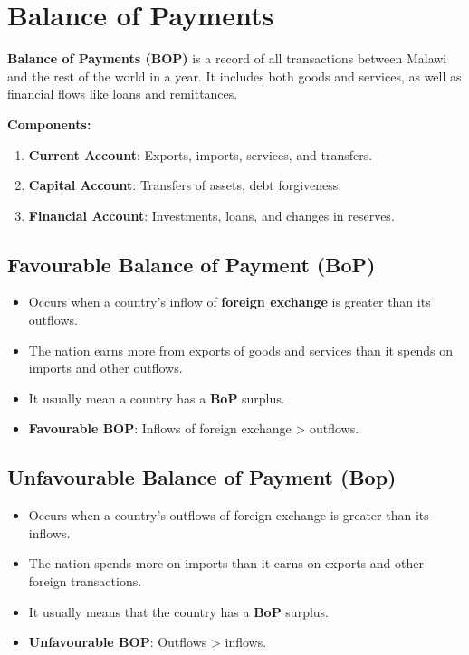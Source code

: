 \documentclass[14pt,a4paper, openany]{book}
\begin{document}
\section{Balance of Payments}
\textbf{Balance of Payments (BOP)} is a record of all transactions between Malawi and the rest of the world in a year.
It includes both goods and services, as well as financial flows like loans and remittances.

\textbf{Components:}
\begin{enumerate}
	\item \textbf{Current Account}: Exports, imports, services, and transfers.
	\item \textbf{Capital Account}: Transfers of assets, debt forgiveness.
	\item \textbf{Financial Account}: Investments, loans, and changes in reserves.
\end{enumerate}

\subsection{Favourable Balance of Payment (BoP)}
\begin{itemize}
	\item Occurs when a country's inflow of \textbf{foreign exchange} is greater than its outflows.
	\item The nation earns more from exports of goods and services than it spends on imports and other outflows.
	\item It usually mean a country has a \textbf{BoP} surplus.
	\item \textbf{Favourable BOP}: Inflows of foreign exchange > outflows.
\end{itemize}

\subsection{Unfavourable Balance of Payment (Bop)}
\begin{itemize}
	\item Occurs when a country's outflows of foreign exchange is greater than its inflows.
	\item The nation spends more on imports than it earns on exports and other foreign transactions.
	\item It usually means that the country has a \textbf{BoP} surplus.
	\item \textbf{Unfavourable BOP}: Outflows > inflows.
\end{itemize}
\end{document}
